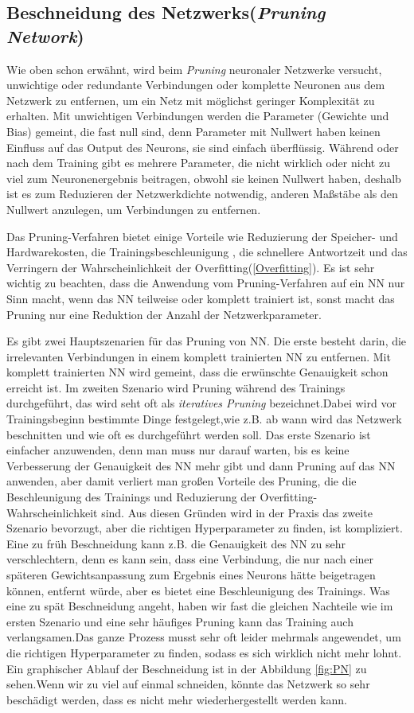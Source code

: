 \documentclass[12pt,a4paper]{scrartcl}
\numberwithin{equation}{section}
\begin{document}
\subsection{Beschneidung des Netzwerks(\textit{Pruning Network})}
Wie oben schon erwähnt, wird beim \textit{Pruning} neuronaler Netzwerke versucht, unwichtige oder redundante Verbindungen oder komplette Neuronen aus dem Netzwerk zu entfernen, um ein Netz mit möglichst geringer Komplexität zu erhalten. Mit unwichtigen Verbindungen werden die Parameter (Gewichte und Bias) gemeint, die fast null sind, denn Parameter mit Nullwert haben keinen Einfluss auf das Output des Neurons, sie sind einfach überflüssig. Während oder nach dem Training gibt es mehrere Parameter, die nicht wirklich oder nicht zu viel zum Neuronenergebnis beitragen, obwohl sie keinen Nullwert haben, deshalb ist es zum Reduzieren der Netzwerkdichte notwendig, anderen Maßstäbe als den Nullwert anzulegen, um Verbindungen zu entfernen.

Das Pruning-Verfahren bietet einige Vorteile wie Reduzierung der Speicher- und Hardwarekosten, die Trainingsbeschleunigung , die schnellere Antwortzeit und das Verringern der Wahrscheinlichkeit der Overfitting(\ref{Overfitting}).
Es ist sehr wichtig zu beachten, dass die Anwendung vom Pruning-Verfahren auf ein \ac{NN} nur Sinn macht, wenn das \ac{NN} teilweise oder komplett trainiert ist, sonst macht das Pruning nur eine Reduktion der Anzahl der Netzwerkparameter.

Es gibt zwei Hauptszenarien für das Pruning von \ac{NN}.
Die erste besteht darin, die irrelevanten Verbindungen in einem komplett trainierten \ac{NN} zu entfernen. Mit komplett trainierten \ac{NN} wird gemeint, dass die erwünschte Genauigkeit schon erreicht ist. Im zweiten Szenario wird Pruning während des Trainings durchgeführt, das wird seht oft als \textit{iteratives Pruning} bezeichnet.Dabei wird vor Trainingsbeginn  bestimmte Dinge festgelegt,wie z.B. ab wann wird das Netzwerk beschnitten und wie oft es durchgeführt werden soll. 
Das erste Szenario ist einfacher anzuwenden, denn man muss nur darauf warten, bis es keine Verbesserung der Genauigkeit des \ac{NN} mehr gibt und dann Pruning auf das \ac{NN} anwenden, aber damit verliert man großen Vorteile des Pruning, die die Beschleunigung des Trainings und Reduzierung der Overfitting-Wahrscheinlichkeit sind.
Aus diesen Gründen wird in der Praxis das zweite Szenario bevorzugt, aber die richtigen Hyperparameter zu finden, ist kompliziert. Eine zu früh Beschneidung kann z.B. die Genauigkeit des \ac{NN} zu sehr verschlechtern, denn es kann sein, dass eine Verbindung, die nur nach einer späteren Gewichtsanpassung zum Ergebnis eines Neurons  hätte beigetragen können, entfernt würde, aber es bietet eine Beschleunigung des Trainings. Was eine zu spät Beschneidung angeht, haben wir fast die gleichen Nachteile wie im ersten Szenario und eine sehr häufiges Pruning kann das Training  auch verlangsamen.Das ganze Prozess musst sehr oft leider mehrmals angewendet, um die richtigen Hyperparameter zu finden, sodass es sich wirklich nicht mehr lohnt. Ein graphischer Ablauf der Beschneidung ist in der Abbildung \ref{fig:PN} zu sehen.Wenn wir zu viel auf einmal schneiden, könnte das Netzwerk so sehr beschädigt werden, dass es nicht mehr wiederhergestellt werden kann.
\end{document}
